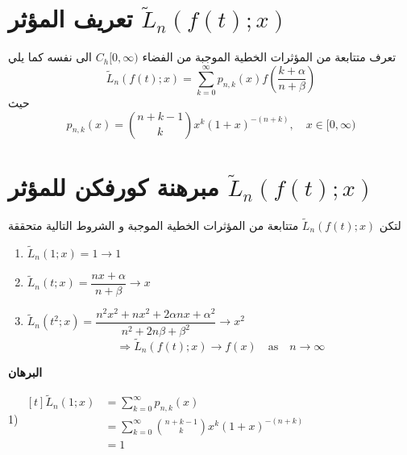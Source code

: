 \newcommand{\tL}{\tilde{L}}
\section{تعريف المؤثر $\tL_n(f(t);x)$}
تعرف متتابعة من المؤثرات الخطية الموجبة من الفضاء $C_h[0, \infty)$ الى نفسه كما يلي
\[
\tL_n(f(t); x) = \sum_{k=0}^{\infty} p_{n, k}(x) f\left(\frac{k+\alpha}{n+\beta}\right)
\]
حيث
\[
p_{n,k} (x) = \binom{n+k-1}{k} x^k (1+x)^{-(n+k)}, \quad x \in [0, \infty)
\]

\section{مبرهنة كورفكن للمؤثر $\tL_n(f(t); x)$}
لتكن $\tL_n(f(t);x)$ متتابعة من المؤثرات الخطية الموجبة  و الشروط التالية متحققة
\begin{english}
	\begin{enumerate}[label=\arabic*)]
		\item $\tL_n(1;x)=1 \to 1$
		\item $\tL_n(t;x) = \dfrac{nx + \alpha}{n + \beta} \to x$
		\item $\tL_n(t^2;x) = \dfrac{n^2x^2 + nx^2 + 2\alpha n x + \alpha^2}{n^2 + 2n\beta+ \beta^2} \to x^2$
		\[
		\Rightarrow\tL_n(f(t);x) \to f(x) \quad\text{as}\quad n\to \infty
		\]
	\end{enumerate}
\end{english}
\noindent
\textbf{البرهان}

\begin{english}
1) $	\begin{aligned}[t]
		\tL_n(1; x) &= \sum_{k=0}^{\infty} p_{n,k}(x)\\
		&= \sum_{k=0}^{\infty}\binom{n+k-1}{k} x^k (1+x)^{-(n+k)} \\
		&=1
	\end{aligned}$
\end{english}

